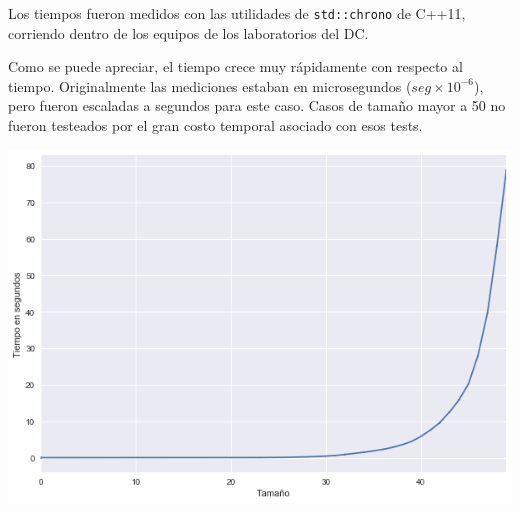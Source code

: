 	Los tiempos fueron medidos con las utilidades de \texttt{std::chrono} de C++11, corriendo dentro de los equipos de los laboratorios del DC.

	Como se puede apreciar, el tiempo crece muy rápidamente con respecto al tiempo. Originalmente las mediciones estaban en microsegundos ($seg \times 10^{-6}$), pero fueron escaladas a segundos para este caso. Casos de tamaño mayor a 50 no fueron testeados por el gran costo temporal asociado con esos tests.

	\begin{center}
	\includegraphics[width=.8\textwidth]{ej1.png}
	\end{center}